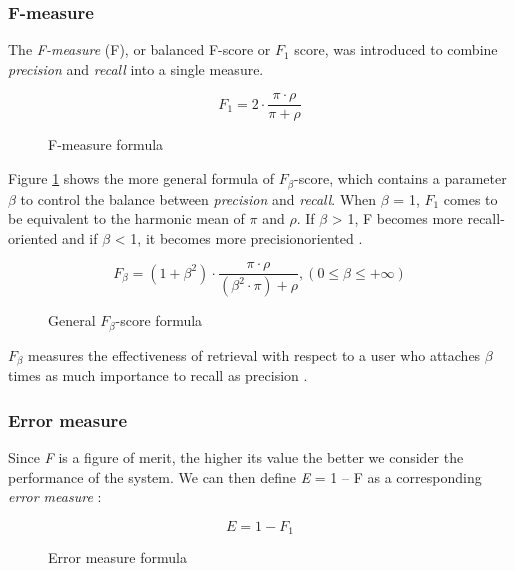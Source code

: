 \subsubsection{F-measure}
The \textit{F-measure} (F), or  balanced F-score or $\textit{F}_\textit{1}$ score, was introduced to combine \textit{precision} and \textit{recall} into a single measure.

\begin{figure}[H]
\begin{displaymath}
	\textit{F}_\textit{1} = 2 \cdot \frac{\pi \cdot \rho}{\pi + \rho}
\end{displaymath}
\caption{F-measure formula}
\end{figure}

Figure \ref{fig:fbeta-score} shows the more general formula of $\textit{F}_\beta$-score, which contains a parameter $\beta$ to control the balance between \textit{precision} and \textit{recall}. When $\beta$ = 1, $\textit{F}_\textit{1}$ comes to be equivalent to the harmonic mean of $\pi$ and $\rho$. If $\beta$ > 1, F becomes more recall-oriented and if $\beta$ < 1, it becomes more precisionoriented \cite{Sasaki:2007}.

\begin{figure}[H]
\begin{displaymath}
	\textit{F}_\beta = (1+\beta^2) \cdot \frac{\pi \cdot \rho}{(\beta^2 \cdot \pi) + \rho}, (0 \le \beta \le +\infty)
\end{displaymath}
\caption{General $\textit{F}_\beta$-score formula \cite{Chinchor:1992}}
\label{fig:fbeta-score}
\end{figure}

$\textit{F}_\beta$ measures the effectiveness of retrieval with respect to a user who attaches $\beta$ times as much importance to recall as precision \cite{Rijsbergen:1979}.

\subsubsection{Error measure}
Since \textit{F} is a figure of merit, the higher its value the better we consider the performance of the system. We can then define \textit{E} = 1 – F as a corresponding \textit{error measure} \cite{Makhoul:1999}:

\begin{figure}[H]
\begin{displaymath}
	\textit{E} = 1 - \textit{F}_1
\end{displaymath}
\caption{Error measure formula}
\end{figure}

